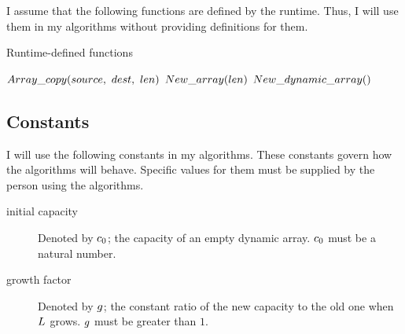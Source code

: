 I assume that the following functions are defined by the runtime. Thus, I will use them in my algorithms without providing definitions for them.

\begin{algorithm}[H]
	\caption{Runtime-defined functions}
	\begin{algorithmic}
		\State $\FuncArrayCopy(source,\ dest,\ len)$
		\State
		\State $New\_array(len)$
		\State
		\State $New\_dynamic\_array()$
	\end{algorithmic}
\end{algorithm}

\subsection{Constants}

I will use the following constants in my algorithms. These constants govern how the algorithms will behave. Specific values for them must be supplied by the person using the algorithms.

\begin{description}
	\item[initial capacity] Denoted by $c_0$; the capacity of an empty dynamic array. $c_0$ must be a natural number.
	\item[growth factor] Denoted by $g$; the constant ratio of the new capacity to the old one when $L$ grows. $g$ must be greater than $1$.
\end{description}
